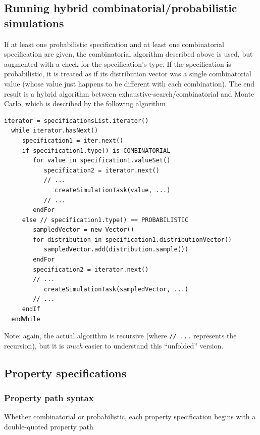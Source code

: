\documentclass{article}
\begin{document}
\subsection{Running hybrid combinatorial/probabilistic simulations}

If at least one probabilistic specification and at least one combinatorial specification are given, the combinatorial algorithm described above is used, but augmented with a check for the specification's type. If the specification is probabilistic, it is treated as if its distribution vector was a single combinatorial value (whose value just happens to be different with each combination). The end result is a hybrid algorithm between exhaustive-search/combinatorial and Monte Carlo, which is described by the following algorithm

\begin{lstlisting}[]
  iterator = specificationsList.iterator()
  while iterator.hasNext()
     specification1 = iter.next()
     if specification1.type() is COMBINATORIAL
        for value in specification1.valueSet()
           specification2 = iterator.next()
           // ...
              createSimulationTask(value, ...)
           // ...
        endFor
     else // specification1.type() == PROBABILISTIC
        sampledVector = new Vector()
        for distribution in specification1.distributionVector()
           sampledVector.add(distribution.sample())
        endFor
        specification2 = iterator.next()
        // ...
           createSimulationTask(sampledVector, ...)
        // ...
     endIf 
  endWhile
\end{lstlisting}

\begin{sideblock}
Note: again, the actual algorithm is recursive (where {\tt // ...} represents the recursion), but it is \textit{much} easier to understand this ``unfolded'' version.
\end{sideblock}

\subsection{Property specifications}

\subsubsection{Property path syntax}

Whether combinatorial or probabilistic, each property specification begins with a double-quoted property path
\end{document}
